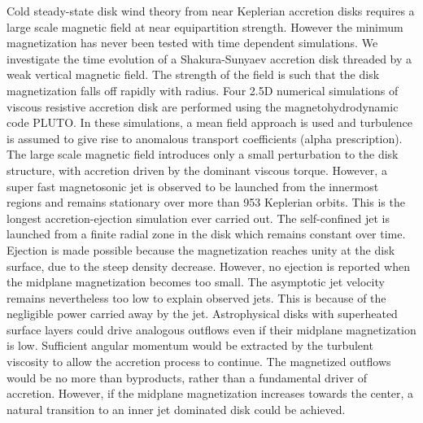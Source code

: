 \documentclass{aa}
\begin{document}
  \abstract 
  {} 
  {Cold steady-state disk wind theory from near Keplerian accretion disks requires a large scale magnetic field at near equipartition strength. However the minimum magnetization has never been tested 
   with time dependent simulations. We investigate the time evolution of a Shakura-Sunyaev accretion disk threaded by a weak vertical magnetic field. The strength of the field is such that the disk 
   magnetization falls off rapidly with radius.}  
  {Four 2.5D numerical simulations of viscous resistive accretion disk are performed using the magnetohydrodynamic code PLUTO.  In these simulations, a mean field approach is used and turbulence 
  is assumed to give rise to anomalous transport coefficients (alpha prescription). }  
  {The large scale magnetic field introduces only a small perturbation to the disk structure, with accretion driven by the dominant viscous torque. However, a super fast magnetosonic jet is observed to be launched 
  from the innermost regions and remains stationary over more than 953 Keplerian orbits. This is the longest accretion-ejection simulation ever carried out. The self-confined jet is launched from a finite radial 
  zone in the disk which remains constant over time. Ejection is made possible because the magnetization reaches unity at the disk surface, due to the steep density decrease. However, no ejection is 
  reported when the midplane magnetization becomes too small. The asymptotic jet velocity remains nevertheless too low to explain observed jets. This is because of the negligible power carried away by the jet.}  
  {Astrophysical disks with superheated surface layers could drive analogous outflows even if their midplane magnetization is low. Sufficient angular momentum would be extracted by the
  turbulent viscosity to allow the accretion process to continue. The magnetized outflows would be no more than byproducts, rather than a fundamental driver of accretion. However, if the midplane
  magnetization increases towards the center, a natural transition to an inner jet dominated disk could be achieved.}


   \maketitle
%
\end{document}

